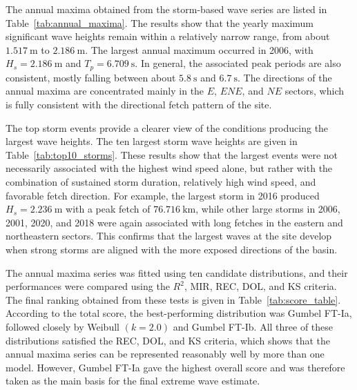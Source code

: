 \documentclass[a4paper, 11pt]{article}
\begin{document}
The annual maxima obtained from the storm-based wave series are listed in Table~\ref{tab:annual_maxima}. The results show that the yearly maximum significant wave heights remain within a relatively narrow range, from about \(1.517\ \mathrm{m}\) to \(2.186\ \mathrm{m}\). The largest annual maximum occurred in 2006, with \(H_s = 2.186\ \mathrm{m}\) and \(T_p = 6.709\ \mathrm{s}\). In general, the associated peak periods are also consistent, mostly falling between about \(5.8\ \mathrm{s}\) and \(6.7\ \mathrm{s}\). The directions of the annual maxima are concentrated mainly in the \(E\), \(ENE\), and \(NE\) sectors, which is fully consistent with the directional fetch pattern of the site.

\begin{table}[H]
    \centering
    \caption{Annual maximum significant wave heights, associated peak periods, and directions.}
    \label{tab:annual_maxima}
    
\end{table}

The top storm events provide a clearer view of the conditions producing the largest wave heights. The ten largest storm wave heights are given in Table~\ref{tab:top10_storms}. These results show that the largest events were not necessarily associated with the highest wind speed alone, but rather with the combination of sustained storm duration, relatively high wind speed, and favorable fetch direction. For example, the largest storm in 2016 produced \(H_s = 2.236\ \mathrm{m}\) with a peak fetch of \(76.716\ \mathrm{km}\), while other large storms in 2006, 2001, 2020, and 2018 were again associated with long fetches in the eastern and northeastern sectors. This confirms that the largest waves at the site develop when strong storms are aligned with the more exposed directions of the basin.

\begin{table}[H]
    \centering
    \caption{Top ten storm events ranked by significant wave height.}
    \label{tab:top10_storms}
    
\end{table}

The annual maxima series was fitted using ten candidate distributions, and their performances were compared using the \(R^2\), MIR, REC, DOL, and KS criteria. The final ranking obtained from these tests is given in Table~\ref{tab:score_table}. According to the total score, the best-performing distribution was Gumbel FT-Ia, followed closely by Weibull \((k=2.0)\) and Gumbel FT-Ib. All three of these distributions satisfied the REC, DOL, and KS criteria, which shows that the annual maxima series can be represented reasonably well by more than one model. However, Gumbel FT-Ia gave the highest overall score and was therefore taken as the main basis for the final extreme wave estimate.
\end{document}
